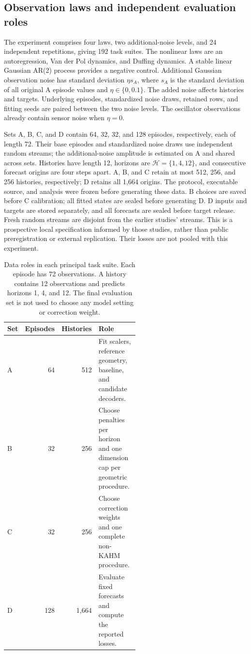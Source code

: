 \subsection{Observation laws and independent evaluation roles}

The experiment comprises four laws, two additional-noise levels, and
24 independent repetitions, giving 192 task suites. The nonlinear laws
are an autoregression, Van der Pol dynamics, and Duffing dynamics. A
stable linear Gaussian AR(2) process provides a negative control.
Additional Gaussian observation noise has standard deviation $\eta s_A$,
where $s_A$ is the standard deviation of all original A episode values
and $\eta\in\{0,0.1\}$. The added noise affects histories and targets.
Underlying episodes, standardized noise draws, retained rows, and fitting
seeds are paired between the two noise levels. The oscillator observations
already contain sensor noise when $\eta=0$.

Sets A, B, C, and D contain 64, 32, 32, and 128 episodes, respectively,
each of length 72. Their base episodes and standardized noise draws use
independent random streams; the additional-noise amplitude is estimated
on A and shared across sets. Histories have length 12, horizons are
$\mathcal H=\{1,4,12\}$, and consecutive forecast origins are four
steps apart. A, B, and C retain at most 512, 256, and 256 histories,
respectively; D retains all 1,664 origins. The protocol, executable source,
and analysis were frozen before generating these data. B choices are
saved before C calibration; all fitted states are sealed before generating
D. D inputs and targets are stored separately, and all forecasts are
sealed before target release. Fresh random streams are disjoint from
the earlier studies' streams. This is a prospective local specification
informed by those studies, rather than public preregistration or external
replication. Their losses are not pooled with this experiment.


\begin{table}[t]
\centering\small
\caption{Data roles in each principal task suite. Each episode has 72
observations. A history contains 12 observations and predicts horizons
1, 4, and 12. The final evaluation set is not used to choose any model
setting or correction weight.}
\label{tab:data-roles}
\begin{tabular}{@{}lrrp{0.54\linewidth}@{}}
\toprule
Set & Episodes & Histories & Role \\
\midrule
A & 64 & 512 & Fit scalers, reference geometry, baseline, and candidate decoders. \\
B & 32 & 256 & Choose penalties per horizon and one dimension cap per geometric procedure. \\
C & 32 & 256 & Choose correction weights and one complete non-KAHM procedure. \\
D & 128 & 1,664 & Evaluate fixed forecasts and compute the reported losses. \\
\bottomrule
\end{tabular}
\end{table}

